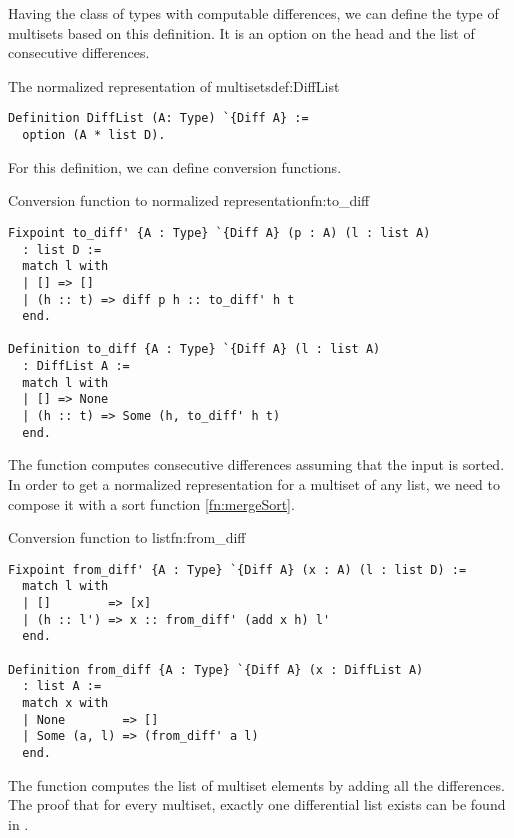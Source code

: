 Having the class of types with computable differences, we can define the type of multisets based on this definition. It is an option on the head and the list of consecutive differences.
\begin{defi}{The normalized representation of multisets}{def:DiffList}
\begin{verbatim}
Definition DiffList (A: Type) `{Diff A} :=
  option (A * list D).
\end{verbatim}
\end{defi}
For this definition, we can define conversion functions.
\begin{func}{Conversion function to normalized representation}{fn:to_diff}
\begin{verbatim}
Fixpoint to_diff' {A : Type} `{Diff A} (p : A) (l : list A) 
  : list D :=
  match l with
  | [] => []
  | (h :: t) => diff p h :: to_diff' h t
  end.

Definition to_diff {A : Type} `{Diff A} (l : list A) 
  : DiffList A :=
  match l with
  | [] => None
  | (h :: t) => Some (h, to_diff' h t)
  end.
\end{verbatim}
\end{func}
The function  computes consecutive differences assuming that the input is sorted. In order to get a normalized representation for a multiset of any list, we need to compose it with a sort function \ref{fn:mergeSort}.
\begin{func}{Conversion function to list}{fn:from_diff}
\begin{verbatim}
Fixpoint from_diff' {A : Type} `{Diff A} (x : A) (l : list D) :=
  match l with
  | []        => [x]
  | (h :: l') => x :: from_diff' (add x h) l'
  end.

Definition from_diff {A : Type} `{Diff A} (x : DiffList A) 
  : list A :=
  match x with
  | None        => []
  | Some (a, l) => (from_diff' a l)
  end.
\end{verbatim}
\end{func}
The function  computes the list of multiset elements by adding all the differences. The proof that for every multiset, exactly one differential list exists can be found in .

